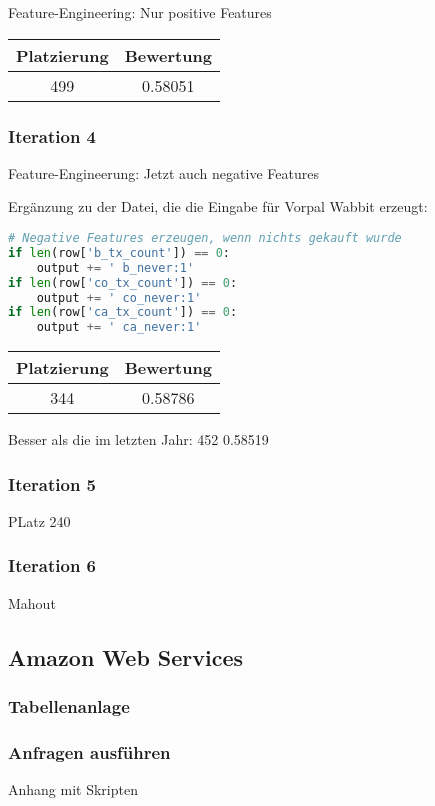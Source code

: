 Feature-Engineering: Nur positive Features

\begin{tabular}{|c|c|}
	\hline \textbf{Platzierung} & \textbf{Bewertung} \\ 
	\hline 499 & 0.58051  \\ 
	\hline 
\end{tabular}

\subsubsection{Iteration 4}

Feature-Engineerung: Jetzt auch negative Features

Ergänzung zu der Datei, die die Eingabe für Vorpal Wabbit erzeugt:
\begin{lstlisting}[language=Python]
# Negative Features erzeugen, wenn nichts gekauft wurde
if len(row['b_tx_count']) == 0:
	output += ' b_never:1'
if len(row['co_tx_count']) == 0:
	output += ' co_never:1'
if len(row['ca_tx_count']) == 0:
	output += ' ca_never:1'
\end{lstlisting}

\begin{tabular}{|c|c|}
	\hline \textbf{Platzierung} & \textbf{Bewertung} \\ 
	\hline 344 & 0.58786  \\ 
	\hline 
\end{tabular}

Besser als die im letzten Jahr: 452 0.58519

\subsubsection{Iteration 5}

PLatz 240

\subsubsection{Iteration 6}

Mahout


	
\subsection{Amazon Web Services}

\subsubsection{Tabellenanlage}

\subsubsection{Anfragen ausführen}

Anhang mit Skripten

